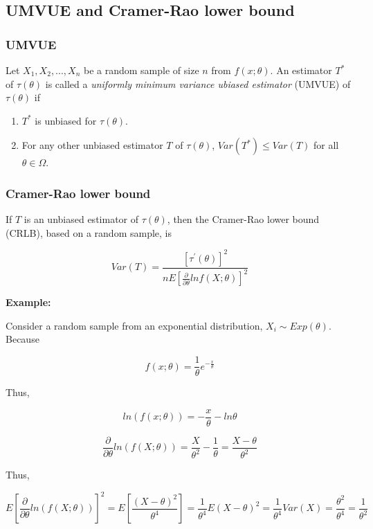 \documentclass[]{book}
\begin{document}
\hypertarget{umvue-and-cramer-rao-lower-bound}{%
\subsection{UMVUE and Cramer-Rao lower bound}\label{umvue-and-cramer-rao-lower-bound}}

\hypertarget{umvue}{%
\subsubsection{UMVUE}\label{umvue}}

Let \(X_1, X_2,...,X_n\) be a random sample of size \(n\) from \(f(x; \theta)\). An estimator \(T^*\) of \(\tau (\theta)\) is called a \emph{uniformly minimum variance ubiased estimator} (UMVUE) of \(\tau(\theta)\) if

\begin{enumerate}
\def\labelenumi{\arabic{enumi}.}
\item
  \(T^*\) is unbiased for \(\tau (\theta)\).
\item
  For any other unbiased estimator \(T\) of \(\tau(\theta)\), \(Var(T^*) \leq Var(T)\) for all \(\theta \in \Omega\).
\end{enumerate}

\hypertarget{cramer-rao-lower-bound}{%
\subsubsection{Cramer-Rao lower bound}\label{cramer-rao-lower-bound}}

If \(T\) is an unbiased estimator of \(\tau(\theta)\), then the Cramer-Rao lower bound (CRLB), based on a random sample, is

\[Var(T)=\frac{[\tau^{'}(\theta)]^2}{nE[\frac{\partial}{\partial \theta} ln f(X; \theta)]^2}\]

\textbf{Example:}

Consider a random sample from an exponential distribution, \(X_i \sim Exp(\theta)\). Because

\[f(x; \theta)=\frac{1}{\theta} e^{-\frac{x}{\theta}}\]

Thus,

\[ln(f(x;\theta))=-\frac{x}{\theta}-ln \theta\]

\[\frac{\partial}{\partial \theta} ln(f(X; \theta))=\frac{X}{\theta^2}-\frac{1}{\theta}=\frac{X-\theta}{\theta^2}\]

Thus,

\[E[\frac{\partial}{\partial \theta} ln(f(X; \theta))]^2 =E[\frac{(X-\theta)^2}{\theta^4}]=\frac{1}{\theta^4}E(X-\theta)^2=\frac{1}{\theta^4} Var(X)=\frac{\theta^2}{\theta^4}=\frac{1}{\theta^2}\]
\end{document}
